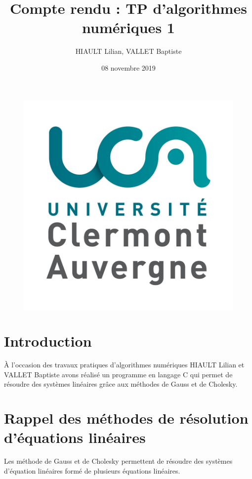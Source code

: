 \documentclass{article}
\title{Compte rendu : TP d'algorithmes numériques 1}
\author{HIAULT Lilian, VALLET Baptiste}
\date{08 novembre 2019}
\begin{document}
\begin{figure}[t]
 \centerline{\includegraphics[scale=0.1]{logoUCA.jpg}}
\end{figure}

\maketitle

\tableofcontents

\newpage

\section*{Introduction}

À l'occasion des travaux pratiques d'algorithmes numériques HIAULT Lilian et VALLET Baptiste avons réalisé un programme en langage C qui permet de résoudre des systèmes linéaires grâce aux méthodes de Gauss et de Cholesky.


\section{Rappel des méthodes de résolution d'équations linéaires}

Les méthode de Gauss et de Cholesky permettent de résoudre des systèmes d'équation linéaires formé de plusieurs équations linéaires.
\end{document}
